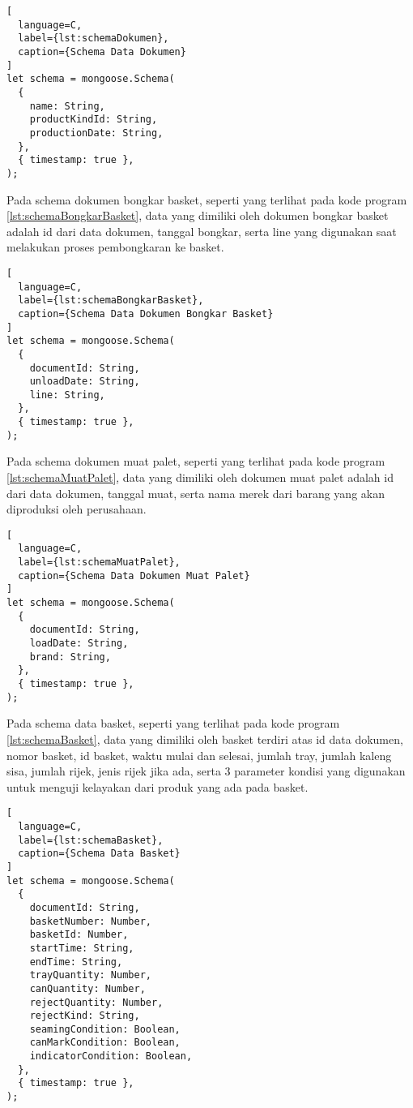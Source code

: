 \begin{lstlisting}[
  language=C,
  label={lst:schemaDokumen},
  caption={Schema Data Dokumen}
]
let schema = mongoose.Schema(
  {
    name: String,
    productKindId: String,
    productionDate: String,
  },
  { timestamp: true },
);
\end{lstlisting}
\vspace{0.5ex}

Pada schema dokumen bongkar basket, seperti yang terlihat pada kode program \ref{lst:schemaBongkarBasket}, data yang dimiliki oleh dokumen bongkar basket adalah id dari data dokumen, tanggal bongkar, serta line yang digunakan saat melakukan proses pembongkaran ke basket.
\vspace{0.5ex}

\begin{lstlisting}[
  language=C,
  label={lst:schemaBongkarBasket},
  caption={Schema Data Dokumen Bongkar Basket}
]
let schema = mongoose.Schema(
  {
    documentId: String,
    unloadDate: String,
    line: String,
  },
  { timestamp: true },
);
\end{lstlisting}
\vspace{0.5ex}

Pada schema dokumen muat palet, seperti yang terlihat pada kode program \ref{lst:schemaMuatPalet}, data yang dimiliki oleh dokumen muat palet adalah id dari data dokumen, tanggal muat, serta nama merek dari barang yang akan diproduksi oleh perusahaan.
\vspace{0.5ex}

\begin{lstlisting}[
  language=C,
  label={lst:schemaMuatPalet},
  caption={Schema Data Dokumen Muat Palet}
]
let schema = mongoose.Schema(
  {
    documentId: String,
    loadDate: String,
    brand: String,
  },
  { timestamp: true },
);
\end{lstlisting}
\vspace{0.5ex}

Pada schema data basket, seperti yang terlihat pada kode program \ref{lst:schemaBasket}, data yang dimiliki oleh basket terdiri atas id data dokumen, nomor basket, id basket, waktu mulai dan selesai, jumlah tray, jumlah kaleng sisa, jumlah rijek, jenis rijek jika ada, serta 3 parameter kondisi yang digunakan untuk menguji kelayakan dari produk yang ada pada basket.
\vspace{0.5ex}

\begin{lstlisting}[
  language=C,
  label={lst:schemaBasket},
  caption={Schema Data Basket}
]
let schema = mongoose.Schema(
  {
    documentId: String,
    basketNumber: Number,
    basketId: Number,
    startTime: String,
    endTime: String,
    trayQuantity: Number,
    canQuantity: Number,
    rejectQuantity: Number,
    rejectKind: String,
    seamingCondition: Boolean,
    canMarkCondition: Boolean,
    indicatorCondition: Boolean,
  },
  { timestamp: true },
);
\end{lstlisting}
\vspace{0.5ex}

